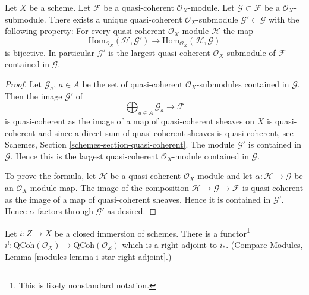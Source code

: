 \begin{lemma}
\label{lemma-largest-quasi-coherent-subsheaf}
Let $X$ be a scheme. Let $\mathcal{F}$ be a quasi-coherent
$\mathcal{O}_X$-module. Let $\mathcal{G} \subset \mathcal{F}$
be a $\mathcal{O}_X$-submodule. There exists a unique quasi-coherent
$\mathcal{O}_X$-submodule $\mathcal{G}' \subset \mathcal{G}$
with the following property: For every quasi-coherent $\mathcal{O}_X$-module
$\mathcal{H}$ the map
$$
\text{Hom}_{\mathcal{O}_X}(\mathcal{H}, \mathcal{G}')
\longrightarrow
\text{Hom}_{\mathcal{O}_X}(\mathcal{H}, \mathcal{G})
$$
is bijective. In particular $\mathcal{G}'$ is the largest quasi-coherent
$\mathcal{O}_X$-submodule of $\mathcal{F}$ contained in $\mathcal{G}$.
\end{lemma}

\begin{proof}
Let $\mathcal{G}_a$, $a \in A$ be the set of quasi-coherent
$\mathcal{O}_X$-submodules contained in $\mathcal{G}$.
Then the image $\mathcal{G}'$ of
$$
\bigoplus\nolimits_{a \in A} \mathcal{G}_a \longrightarrow \mathcal{F}
$$
is quasi-coherent as the image of a map of quasi-coherent sheaves
on $X$ is quasi-coherent and since a direct sum of quasi-coherent sheaves
is quasi-coherent, see
Schemes, Section \ref{schemes-section-quasi-coherent}.
The module $\mathcal{G}'$ is contained in $\mathcal{G}$. Hence this is the
largest quasi-coherent $\mathcal{O}_X$-module contained in $\mathcal{G}$.

\medskip\noindent
To prove the formula, let $\mathcal{H}$ be a quasi-coherent
$\mathcal{O}_X$-module and let $\alpha : \mathcal{H} \to \mathcal{G}$
be an $\mathcal{O}_X$-module map. The image of the composition
$\mathcal{H} \to \mathcal{G} \to \mathcal{F}$ is quasi-coherent
as the image of a map of quasi-coherent sheaves. Hence it is contained
in $\mathcal{G}'$. Hence $\alpha$ factors through $\mathcal{G}'$
as desired.
\end{proof}

\begin{lemma}
\label{lemma-i-upper-shriek}
Let $i : Z \to X$ be a closed immersion of schemes.
There is a functor\footnote{This is likely nonstandard notation.}
$i^! : \text{QCoh}(\mathcal{O}_X) \to \text{QCoh}(\mathcal{O}_Z)$
which is a right adjoint to $i_*$. (Compare
Modules, Lemma \ref{modules-lemma-i-star-right-adjoint}.)
\end{lemma}

